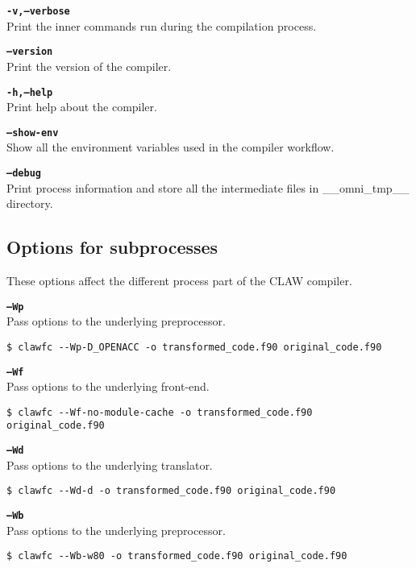 \documentclass{article}
\begin{document}
\textbf{\texttt{-v,--verbose}}\\
Print the inner commands run during the compilation process.

\textbf{\texttt{--version}}\\
Print the version of the compiler.

\textbf{\texttt{-h,--help}}\\
Print help about the compiler.

\textbf{\texttt{--show-env}}\\
Show all the environment variables used in the compiler workflow.

\textbf{\texttt{--debug}}\\
Print process information and store all the intermediate files in \_\_omni\_tmp\_\_ directory.

\subsection{Options for subprocesses}
These options affect the different process part of the CLAW compiler.

\textbf{\texttt{--Wp}}\\
Pass options to the underlying preprocessor.
\begin{lstlisting}
$ clawfc --Wp-D_OPENACC -o transformed_code.f90 original_code.f90
\end{lstlisting}

\textbf{\texttt{--Wf}}\\
Pass options to the underlying front-end.
\begin{lstlisting}
$ clawfc --Wf-no-module-cache -o transformed_code.f90 original_code.f90
\end{lstlisting}

\textbf{\texttt{--Wd}}\\
Pass options to the underlying translator.
\begin{lstlisting}
$ clawfc --Wd-d -o transformed_code.f90 original_code.f90
\end{lstlisting}

\textbf{\texttt{--Wb}}\\
Pass options to the underlying preprocessor.
\begin{lstlisting}
$ clawfc --Wb-w80 -o transformed_code.f90 original_code.f90
\end{lstlisting}
\end{document}
